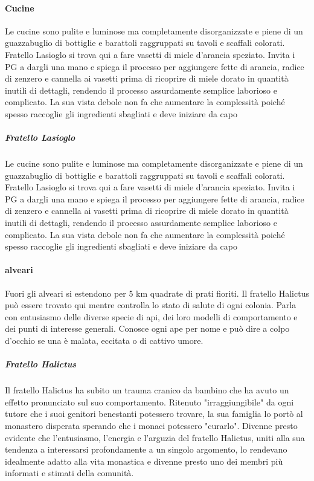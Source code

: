 \documentclass{article}
\begin{document}
    \paragraph{Cucine}Le cucine sono pulite e luminose ma completamente disorganizzate e piene di un guazzabuglio di bottiglie e barattoli raggruppati su tavoli e scaffali colorati.
    Fratello Lasioglo si trova qui a fare vasetti di miele d'arancia speziato. Invita i PG a dargli una mano e spiega il processo per aggiungere fette di arancia, radice di zenzero e cannella ai vasetti prima di ricoprire di miele dorato in quantità inutili di dettagli, rendendo il processo assurdamente semplice laborioso e complicato. La sua vista debole non fa che aumentare la complessità poiché spesso raccoglie gli ingredienti sbagliati e deve iniziare da capo
    \subparagraph{Fratello Lasioglo}Le cucine sono pulite e luminose ma completamente disorganizzate e piene di un guazzabuglio di bottiglie e barattoli raggruppati su tavoli e scaffali colorati.
    Fratello Lasioglo si trova qui a fare vasetti di miele d'arancia speziato. Invita i PG a dargli una mano e spiega il processo per aggiungere fette di arancia, radice di zenzero e cannella ai vasetti prima di ricoprire di miele dorato in quantità inutili di dettagli, rendendo il processo assurdamente semplice laborioso e complicato. La sua vista debole non fa che aumentare la complessità poiché spesso raccoglie gli ingredienti sbagliati e deve iniziare da capo
    \paragraph{alveari}
    Fuori gli alveari si estendono per 5 km quadrate di prati fioriti.
Il fratello Halictus può essere trovato qui mentre controlla lo stato di salute di ogni colonia. Parla con entusiasmo delle diverse specie di api, dei loro modelli di comportamento e dei punti di interesse generali. Conosce ogni ape per nome e può dire a colpo d'occhio se una è malata, eccitata o di cattivo umore.
    \subparagraph{Fratello Halictus}Il fratello Halictus ha subito un trauma cranico da bambino che ha avuto un effetto pronunciato sul suo comportamento. Ritenuto "irraggiungibile" da ogni tutore che i suoi genitori benestanti potessero trovare, la sua famiglia lo portò al monastero disperata sperando che i monaci potessero "curarlo". Divenne presto evidente che l'entusiasmo, l'energia e l'arguzia del fratello Halictus, uniti alla sua tendenza a interessarsi profondamente a un singolo argomento, lo rendevano idealmente adatto alla vita monastica e divenne presto uno dei membri più informati e stimati della comunità.
\end{document}
